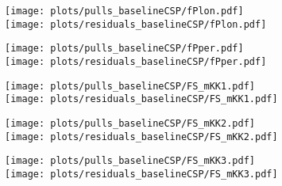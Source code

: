 \begin{subappendices}
\begin{figure}[H] 
  \centering
  \begin{multicols}{2}
  \texttt{[image: plots/pulls\_baselineCSP/fPlon.pdf]}  \\
  \texttt{[image: plots/residuals\_baselineCSP/fPlon.pdf]}
  \end{multicols}  
  \begin{multicols}{2}
  \texttt{[image: plots/pulls\_baselineCSP/fPper.pdf]}  \\
  \texttt{[image: plots/residuals\_baselineCSP/fPper.pdf]}
  \end{multicols}  
  \begin{multicols}{2}
  \texttt{[image: plots/pulls\_baselineCSP/FS\_mKK1.pdf]}  \\
  \texttt{[image: plots/residuals\_baselineCSP/FS\_mKK1.pdf]}
  \end{multicols}  
  \begin{multicols}{2}
  \texttt{[image: plots/pulls\_baselineCSP/FS\_mKK2.pdf]}  \\
  \texttt{[image: plots/residuals\_baselineCSP/FS\_mKK2.pdf]}
  \end{multicols}  
  \begin{multicols}{2}
  \texttt{[image: plots/pulls\_baselineCSP/FS\_mKK3.pdf]}  \\
  \texttt{[image: plots/residuals\_baselineCSP/FS\_mKK3.pdf]}
  \end{multicols}    
\end{figure}


\end{subappendices}
